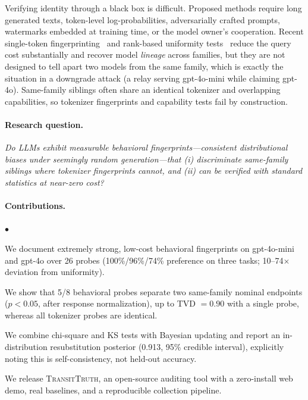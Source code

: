 \documentclass[10pt,twocolumn,letterpaper]{article}
\begin{document}
Verifying identity through a black box is difficult. Proposed methods require long generated texts, token-level log-probabilities, adversarially crafted prompts, watermarks embedded at training time, or the model owner's cooperation. Recent single-token fingerprinting~\cite{bruckner2026token} and rank-based uniformity tests~\cite{zhu2025rank} reduce the query cost substantially and recover model \emph{lineage} across families, but they are not designed to tell apart two models from the same family, which is exactly the situation in a downgrade attack (a relay serving gpt-4o-mini while claiming gpt-4o). Same-family siblings often share an identical tokenizer and overlapping capabilities, so tokenizer fingerprints and capability tests fail by construction.

\paragraph{Research question.}
\emph{Do LLMs exhibit measurable behavioral fingerprints---consistent distributional biases under seemingly random generation---that (i) discriminate same-family siblings where tokenizer fingerprints cannot, and (ii) can be verified with standard statistics at near-zero cost?}

\paragraph{Contributions.}
\begin{list}{$\bullet$}{\setlength{\leftmargin}{1.4em}\setlength{\itemsep}{0.1em}}
\item We document extremely strong, low-cost behavioral fingerprints on gpt-4o-mini and gpt-4o over 26 probes (100\%/96\%/74\% preference on three tasks; 10--74$\times$ deviation from uniformity).
\item We show that 5/8 behavioral probes separate two same-family nominal endpoints ($p<0.05$, after response normalization), up to TVD $=0.90$ with a single probe, whereas all tokenizer probes are identical.
\item We combine chi-square and KS tests with Bayesian updating and report an in-distribution resubstitution posterior (0.913, 95\% credible interval), explicitly noting this is self-consistency, not held-out accuracy.
\item We release \textsc{TransitTruth}, an open-source auditing tool with a zero-install web demo, real baselines, and a reproducible collection pipeline.
\end{list}
\end{document}
